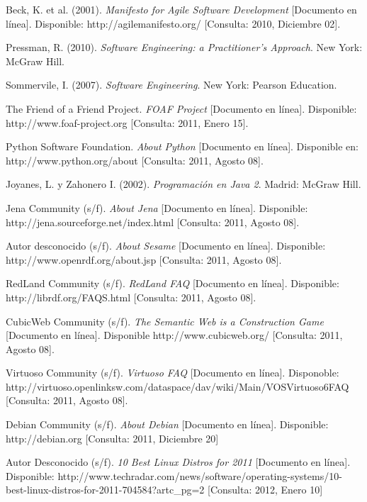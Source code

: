 \begin{thebibliography}{20}
     Beck, K. et al. (2001). \emph{Manifesto for Agile Software Development} [Documento en línea]. Disponible: http://agilemanifesto.org/ [Consulta: 2010, Diciembre 02].

     Pressman, R. (2010). \emph{Software Engineering: a Practitioner's Approach}. New York: McGraw Hill.

     Sommervile, I. (2007). \emph{Software Engineering}. New York: Pearson Education.

     The Friend of a Friend Project. \emph{FOAF Project} [Documento en línea]. Disponible: http://www.foaf-project.org [Consulta: 2011, Enero 15].

     Python Software Foundation. \emph{About Python} [Documento en línea]. Disponible en: http://www.python.org/about [Consulta: 2011, Agosto 08].

     Joyanes, L. y Zahonero I. (2002). \emph{Programación en Java 2}. Madrid: McGraw Hill.

     Jena Community (s/f). \emph{About Jena} [Documento en línea]. Disponible: http://jena.sourceforge.net/index.html [Consulta: 2011, Agosto 08].

     Autor desconocido (s/f). \emph{About Sesame} [Documento en línea]. Disponible: http://www.openrdf.org/about.jsp [Consulta: 2011, Agosto 08].

     RedLand Community (s/f). \emph{RedLand FAQ} [Documento en línea]. Disponible: http://librdf.org/FAQS.html [Consulta: 2011, Agosto 08].

     CubicWeb Community (s/f). \emph{The Semantic Web is a Construction Game} [Documento en línea]. Disponible http://www.cubicweb.org/ [Consulta: 2011, Agosto 08].

     Virtuoso Community (s/f). \emph{Virtuoso FAQ} [Documento en línea]. Disponoble: http://virtuoso.openlinksw.com/dataspace/dav/wiki/Main/VOSVirtuoso6FAQ [Consulta: 2011, Agosto 08].

     Debian Community (s/f). \emph{About Debian} [Documento en línea]. Disponible: http://debian.org [Consulta: 2011, Diciembre 20]

     Autor Desconocido (s/f). \emph{10 Best Linux Distros for 2011} [Documento en línea]. Disponible: http://www.techradar.com/news/software/operating-systems/10-best-linux-distros-for-2011-704584?artc\_pg=2 [Consulta: 2012, Enero 10]


\end{thebibliography}
